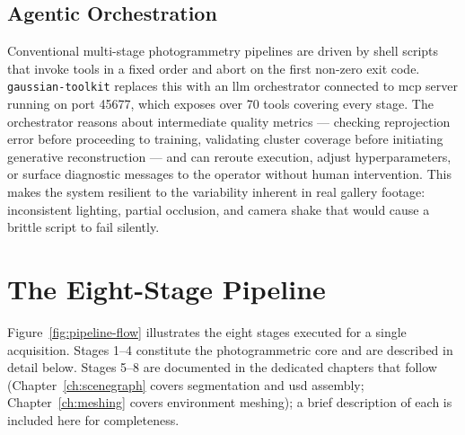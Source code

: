 \subsection{Agentic Orchestration}

Conventional multi-stage photogrammetry pipelines are driven by shell scripts that invoke
tools in a fixed order and abort on the first non-zero exit code. \texttt{gaussian-toolkit}
replaces this with an \acrshort{llm} orchestrator connected to \acrshort{mcp} server
running on port 45677, which exposes over 70 tools covering every stage. The orchestrator
reasons about intermediate quality metrics — checking reprojection error before proceeding
to training, validating cluster coverage before initiating generative reconstruction — and
can reroute execution, adjust hyperparameters, or surface diagnostic messages to the
operator without human intervention. This makes the system resilient to the variability
inherent in real gallery footage: inconsistent lighting, partial occlusion, and
camera shake that would cause a brittle script to fail silently.

\section{The Eight-Stage Pipeline}\label{sec:pipeline-stages}

Figure~\ref{fig:pipeline-flow} illustrates the eight stages executed for a single
acquisition. Stages 1–4 constitute the photogrammetric core and are described in
detail below. Stages 5–8 are documented in the dedicated chapters that follow
(Chapter~\ref{ch:scenegraph} covers segmentation and \acrshort{usd} assembly;
Chapter~\ref{ch:meshing} covers environment meshing); a brief description of each
is included here for completeness.


